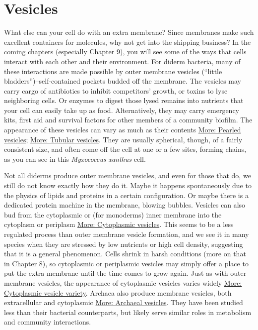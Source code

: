 \documentclass[]{tufte-book}
\begin{document}
\hypertarget{vesicles}{%
\section{Vesicles}\label{vesicles}}

What else can your cell do with an extra membrane? Since membranes make such excellent containers for molecules, why not get into the shipping business? In the coming chapters (especially Chapter 9), you will see some of the ways that cells interact with each other and their environment. For diderm bacteria, many of these interactions are made possible by outer membrane vesicles (``little bladders'')--self-contained pockets budded off the membrane. The vesicles may carry cargo of antibiotics to inhibit competitors' growth, or toxins to lyse neighboring cells. Or enzymes to digest those lysed remains into nutrients that your cell can easily take up as food. Alternatively, they may carry emergency kits, first aid and survival factors for other members of a community biofilm. The appearance of these vesicles can vary as much as their contents \protect\hyperlink{Pearled_vesicles}{More: Pearled vesicles}; \protect\hyperlink{Tubular_vesicles}{More: Tubular vesicles}. They are usually spherical, though, of a fairly consistent size, and often come off the cell at one or a few sites, forming chains, as you can see in this \emph{Myxococcus xanthus} cell.

Not all diderms produce outer membrane vesicles, and even for those that do, we still do not know exactly how they do it. Maybe it happens spontaneously due to the physics of lipids and proteins in a certain configuration. Or maybe there is a dedicated protein machine in the membrane, blowing bubbles. Vesicles can also bud from the cytoplasmic or (for monoderms) inner membrane into the cytoplasm or periplasm \protect\hyperlink{Cytoplasmic_vesicles}{More: Cytoplasmic vesicles}. This seems to be a less regulated process than outer membrane vesicle formation, and we see it in many species when they are stressed by low nutrients or high cell density, suggesting that it is a general phenomenon. Cells shrink in harsh conditions (more on that in Chapter 8), so cytoplasmic or periplasmic vesicles may simply offer a place to put the extra membrane until the time comes to grow again. Just as with outer membrane vesicles, the appearance of cytoplasmic vesicles varies widely \protect\hyperlink{Cytoplasmic_vesicle_variety}{More: Cytoplasmic vesicle variety}. Archaea also produce membrane vesicles, both extracellular and cytoplasmic \protect\hyperlink{Archaeal_vesicles}{More: Archaeal vesicles}. They have been studied less than their bacterial counterparts, but likely serve similar roles in metabolism and community interactions.
\end{document}
